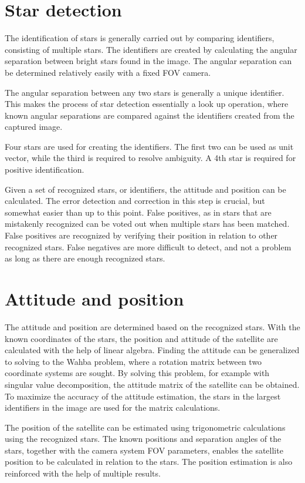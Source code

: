 \documentclass[12pt]{report}
\begin{document}
\section{Star detection}
The identification of stars is generally carried out by comparing identifiers, consisting of multiple stars. The identifiers are created by calculating the angular separation between bright stars found in the image. The angular separation can be determined relatively easily with a fixed FOV camera. \citep*{SatDesgin}
\par
The angular separation between any two stars is generally a unique identifier. This makes the process of star detection essentially a look up operation, where known angular separations are compared against the identifiers created from the captured image. \citep*{SatDesgin}
\par
Four stars are used for creating the identifiers. The first two can be used as unit vector, while the third is required to resolve ambiguity. A 4th star is required for positive identification. \citep*{SatDesgin} \citep*{StreakDet}
\par
Given a set of recognized stars, or identifiers, the attitude and position can be calculated. The error detection and correction in this step is crucial, but somewhat easier than up to this point. False positives, as in stars that are mistakenly recognized can be voted out when multiple stars has been matched. False positives are recognized by verifying their position in relation to other recognized stars. False negatives are more difficult to detect, and not a problem as long as there are enough recognized stars.

\section{Attitude and position}
The attitude and position are determined based on the recognized stars. With the known coordinates of the stars, the position and attitude of the satellite are calculated with the help of linear algebra. Finding the attitude can be generalized to solving to the Wahba problem, where a rotation matrix between two coordinate systems are sought. By solving this problem, for example with singular value decomposition, the attitude matrix of the satellite can be obtained. To maximize the accuracy of the attitude estimation, the stars in the largest identifiers in the image are used for the matrix calculations.\citep*{StRef} \citep*{StreakDet}
\par
The position of the satellite can be estimated using trigonometric calculations using the recognized stars. The known positions and separation angles of the stars, together with the camera system FOV parameters, enables the satellite position to be calculated in relation to the stars. The position estimation is also reinforced with the help of multiple results. \citep*{StDev}
\end{document}
